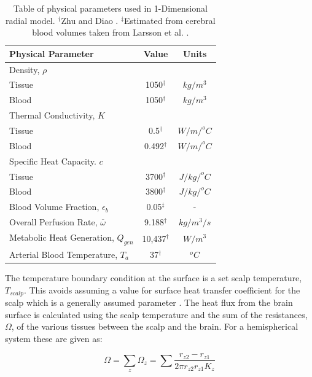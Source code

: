 \documentclass[11pt,english,a4paper,twoside,openright]{report}
\begin{document}
{{{{{{{{\begin{table}
	\centering
	\fontsize{8pt}{9pt}\selectfont
	\begin{tabular}{p{5.0cm} c c}
		\toprule
		\textbf{Physical Parameter} & \textbf{Value} & \textbf{Units}\\ \hline
		Density, $\rho$ & &\\
		\qquad Tissue & 1050$^{\dagger}$ & $kg/m^{3}$ \\ 
		\qquad Blood & 1050$^{\dagger}$ & $kg/m^{3}$ \\ 
		Thermal Conductivity, $K$ & &\\
		\qquad Tissue & 0.5$^{\dagger}$ & $W/m/^{o}C$ \\ 
		\qquad Blood & 0.492$^{\dagger}$ & $W/m/^{o}C$ \\
		Specific Heat Capacity. $c$  & &\\
		\qquad Tissue & 3700$^{\dagger}$ & $J/kg/^{o}C$ \\ 
		\qquad Blood & 3800$^{\dagger}$ & $J/kg/^{o}C$ \\
		Blood Volume Fraction, $\epsilon_{b}$ & 0.05$^{\ddagger}$ & - \\
		Overall Perfusion Rate, $\overline{\omega}$ & 9.188$^{\dagger}$ & $kg/m^{3}/s$ \\
		Metabolic Heat Generation, $Q_{gen}$ & 10,437$^{\dagger}$ & $W/m^{3}$ \\
		Arterial Blood Temperature, $T_{a}$ & 37$^{\dagger}$ & $^{o}C$ \\ \bottomrule
	\end{tabular}
	
	\caption[Table of physical parameters used in 1-Dimensional radial model]{Table of physical parameters used in 1-Dimensional radial model. $^{\dagger}$Zhu and Diao \cite{zhu2001theoretical}. $^{\ddagger}$Estimated from cerebral blood volumes taken from Larsson et al. \cite{larsson2009measurement}.}
	\label{tab:physicalparams}
\end{table}

The temperature boundary condition at the surface is a set scalp temperature, $T_{scalp}$. This avoids assuming a value for surface heat transfer coefficient for the scalp which is a generally assumed parameter \cite{nelson1998brain,xuan1997bioheat}. The heat flux from the brain surface is calculated using the scalp temperature and the sum of the resistances, $\Omega$, of the various tissues between the scalp and the brain. For a hemispherical system these are given as:

\begin{equation}
\Omega = \sum_{z}\Omega_{z}=\sum\frac{r_{z2}-r_{z1}}{2\pi r_{z2}r_{z1}K_{z}}
\end{equation}

}}}}}}}}
\end{document}

